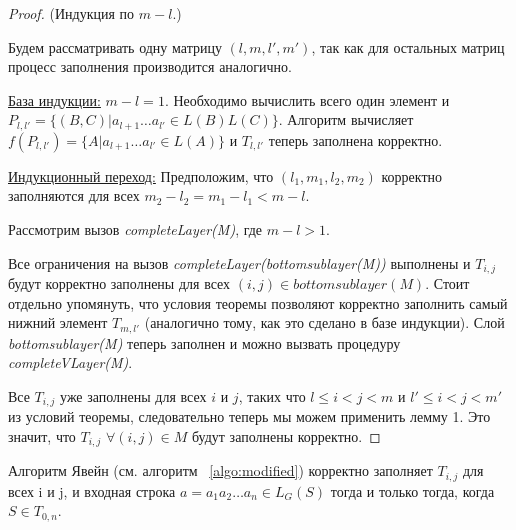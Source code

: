 \begin{proof}(Индукция по $m - l$.)

Будем рассматривать одну матрицу $(l, m, l', m')$, так как для остальных матриц процесс заполнения производится аналогично.

\underline{База индукции:} $m - l = 1$. Необходимо вычислить всего один элемент и $P_{l, l'} =  \{ (B, C) |  a_{l + 1} \dots a_{l'} \in L(B)L(C)\}$. Алгоритм вычисляет $f(P_{l, l'}) = \{ A |  a_{l + 1} \dots a_{l'} \in L(A)\}$ и $T_{l, l'}$ теперь заполнена корректно.

\underline{Индукционный переход:} Предположим, что $(l_1, m_1, l_2, m_2)$ корректно заполняются для всех $m_2 - l_2 = m_1 - l_1 < m - l$.

Рассмотрим вызов \textit{completeLayer(M)}, где $m - l > 1$.

Все ограничения на вызов \textit{completeLayer(bottomsublayer(M))} выполнены и $T_{i, j}$ будут корректно заполнены для всех $(i, j) \in bottomsublayer(M)$. Стоит отдельно упомянуть, что условия теоремы позволяют корректно заполнить самый нижний элемент $T_{m, l'}$ (аналогично тому, как это сделано в базе индукции).
Слой \textit{bottomsublayer(M)} теперь заполнен и можно вызвать процедуру \textit{completeVLayer(M)}.

Все $T_{i,j}$ уже заполнены для всех $i$ и $j$, таких что $l \leq i < j < m$ и $l' \leq i < j < m'$ из условий теоремы, следовательно теперь мы можем применить лемму 1. Это значит, что $T_{i, j}$ $\forall (i, j) \in M$ будут заполнены корректно.
\end{proof}

\begin{theorem}
Алгоритм Явейн (см. алгоритм ~\ref{algo:modified}) корректно заполняет $T_{i, j}$ для всех i и j, и входная строка $a = a_{1}a_{2} \dots a_{n} \in L_{G}(S)$ тогда и только тогда, когда $S \in T_{0, n}$.
\end{theorem}

